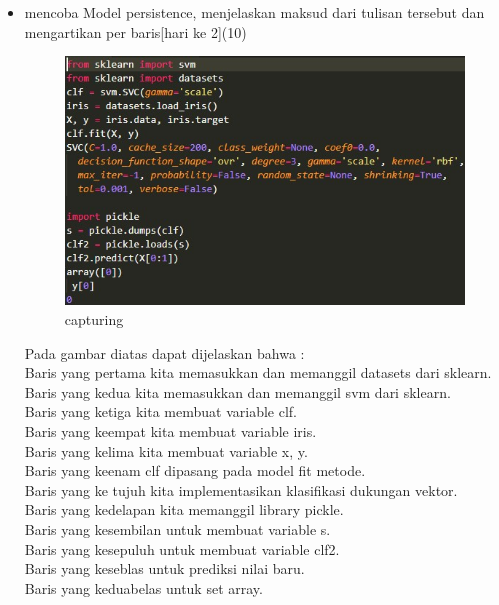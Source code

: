 \begin{enumerate}
\begin{itemize}
\item
mencoba Model persistence, menjelaskan maksud dari tulisan tersebut dan mengartikan per baris[hari ke 2](10)
\begin{figure}[ht]
\centering
 \includegraphics[scale=0.5]{figures/cahya4.png}
 \caption{capturing}	
\end{figure}
Pada gambar diatas dapat dijelaskan bahwa :\\
Baris yang pertama kita memasukkan dan memanggil datasets dari sklearn.\\
Baris yang kedua kita memasukkan dan memanggil svm dari sklearn.\\
Baris yang ketiga kita  membuat variable clf.\\
Baris yang keempat kita  membuat variable iris.\\
Baris yang kelima kita  membuat variable x, y.\\
Baris yang keenam  clf dipasang pada model fit metode.\\
Baris yang ke tujuh kita  implementasikan klasifikasi dukungan vektor.\\
Baris yang kedelapan kita memanggil library pickle.\\
Baris yang kesembilan untuk  membuat variable s.\\
Baris yang kesepuluh untuk  membuat variable clf2.\\
Baris yang keseblas untuk  prediksi nilai baru.\\
Baris yang keduabelas untuk  set array.

\end{itemize} 
\end{enumerate}

